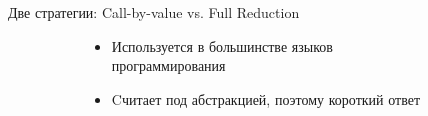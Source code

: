\begin{frame}{Две стратегии: Call-by-value vs. Full Reduction}
\begin{figure}[ht]
  \begin{subfigure}[t]{.48\textwidth}
  \end{subfigure}
  \begin{subfigure}[t]{.48\textwidth}
   \end{subfigure}
\end{figure}


    \begin{figure}[t]
      \begin{subfigure}[t]{0.45\textwidth}
    \begin{itemize}
    \item[\faGood]    Используется в большинстве языков программирования
    \vspace{4em}
    \end{itemize}
      \end{subfigure}
      \begin{subfigure}[t]{0.45\textwidth}
    \begin{itemize}
      \item[\faGood] Cчитает под абстракцией, поэтому короткий ответ
    \end{itemize}
      \end{subfigure}
    \end{figure}
\end{frame}

